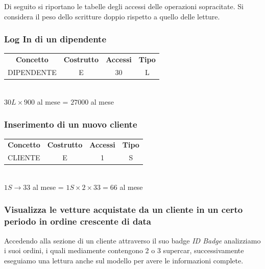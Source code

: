 \documentclass[12pt]{article}
\begin{document}
Di seguito si riportano le tabelle degli accessi delle operazioni sopracitate.
Si considera il peso dello scritture doppio rispetto a quello delle letture.

\subsubsection{Log In di un dipendente}

\begin{table}[H]
    \centering
    \begin{tabular}{ c c c c }
        \rowcolor{red!20!}
        \textbf{Concetto} & \textbf{Costrutto} & \textbf{Accessi} &
        \textbf{Tipo}\\
        DIPENDENTE & E & 30 & L \\
    \end{tabular}\\
    \( 30L \times 900 \) al mese = \( 27000 \) al mese 
\end{table}

\subsubsection{Inserimento di un nuovo cliente}

\begin{table}[H]
    \centering
    \begin{tabular}{ c c c c }
        \rowcolor{red!20!}
        \textbf{Concetto} & \textbf{Costrutto} & \textbf{Accessi} &
        \textbf{Tipo}\\
        CLIENTE & E & 1 & S \\
    \end{tabular}\\
    \( 1S \rightarrow 33 \) al mese = \( 1S \times 2 \times 33 = 66 \) al mese
\end{table}


\subsubsection{Visualizza le vetture acquistate da un cliente in un certo periodo in
ordine crescente di data}

Accedendo alla sezione di un cliente attraverso il suo badge \textit{ID Badge}
analizziamo i suoi ordini, i quali mediamente contengono 2 o 3 supercar,
successivamente eseguiamo una lettura anche sul modello per avere le
informazioni complete.
\end{document}
